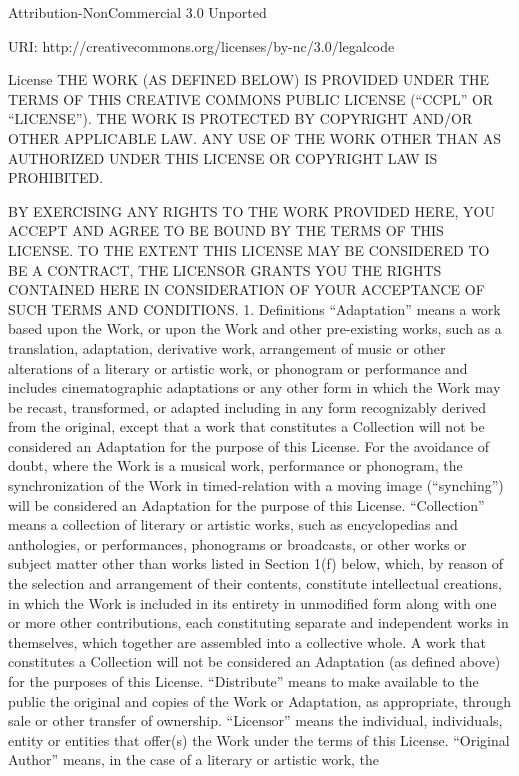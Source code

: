 \documentclass[oneside]{book}
\begin{document}
Attribution-NonCommercial 3.0 Unported

URI:  http://creativecommons.org/licenses/by-nc/3.0/legalcode

License
THE WORK (AS DEFINED BELOW) IS PROVIDED UNDER THE TERMS OF THIS CREATIVE COMMONS
PUBLIC LICENSE (``CCPL'' OR ``LICENSE''). THE WORK IS PROTECTED BY COPYRIGHT
AND/OR OTHER APPLICABLE LAW. ANY USE OF THE WORK OTHER THAN AS AUTHORIZED UNDER
THIS LICENSE OR COPYRIGHT LAW IS PROHIBITED.

BY EXERCISING ANY RIGHTS TO THE WORK PROVIDED HERE, YOU ACCEPT AND AGREE TO BE
BOUND BY THE TERMS OF THIS LICENSE. TO THE EXTENT THIS LICENSE MAY BE CONSIDERED
TO BE A CONTRACT, THE LICENSOR GRANTS YOU THE RIGHTS CONTAINED HERE IN
CONSIDERATION OF YOUR ACCEPTANCE OF SUCH TERMS AND CONDITIONS.
1. Definitions
``Adaptation'' means a work based upon the Work, or upon the Work and other
pre-existing works, such as a translation, adaptation, derivative work,
arrangement of music or other alterations of a literary or artistic work, or
phonogram or performance and includes cinematographic adaptations or any other
form in which the Work may be recast, transformed, or adapted including in any
form recognizably derived from the original, except that a work that constitutes
a Collection will not be considered an Adaptation for the purpose of this
License. For the avoidance of doubt, where the Work is a musical work,
performance or phonogram, the synchronization of the Work in timed-relation with
a moving image (``synching'') will be considered an Adaptation for the purpose
of this License.
``Collection'' means a collection of literary or artistic works, such as
encyclopedias and anthologies, or performances, phonograms or broadcasts, or
other works or subject matter other than works listed in Section 1(f) below,
which, by reason of the selection and arrangement of their contents, constitute
intellectual creations, in which the Work is included in its entirety in
unmodified form along with one or more other contributions, each constituting
separate and independent works in themselves, which together are assembled into
a collective whole. A work that constitutes a Collection will not be considered
an Adaptation (as defined above) for the purposes of this License.
``Distribute'' means to make available to the public the original and copies of
the Work or Adaptation, as appropriate, through sale or other transfer of
ownership.
``Licensor'' means the individual, individuals, entity or entities that offer(s)
the Work under the terms of this License.
``Original Author'' means, in the case of a literary or artistic work, the
\end{document}
